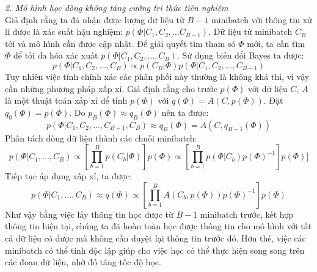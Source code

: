 \documentclass[fontsize=13pt]{scrartcl}
\begin{document}
\textit{2. Mô hình học dòng không tăng cường tri thức tiên nghiệm}\\
Giả định rằng ta đã nhận được lượng dữ liệu từ $B-1$ minibatch với thông tin xử lí được là xác suất hậu nghiệm: $p(\Phi | C_1,C_2,…C_{B-1} )$. Dữ liệu từ minibatch $C_B$ tới và mô hình cần được cập nhật.
Để giải quyết tìm tham só $\Phi$ mới, ta cần tìm $\Phi$ để tối đa hóa xác xuất $p(\Phi| C_1,C_2, …,C_B)$. Sử dụng biến đổi Bayes ta được:
\begin{equation}\label{eq:oldstream}
p(\Phi| C_1, C_2, \ldots,C_B) \propto p(C_B| \Phi)p(\Phi| C_1, C_2,\ldots, C_{B-1})
\end{equation}
Tuy nhiên việc tính chính xác các phân phối này thường là không khả thi, vì vậy cần những phương pháp xấp xỉ. 
Giả định rằng cho trước $p(\Phi)$ với dữ liệu $C$, $A$ là một thuật toán xấp xỉ để tính $p(\Phi)$ với $q(\Phi) = A(C,p(\Phi))$. Đặt $q_0(\Phi) = p(\Phi)$. Do $p_B(\Phi) \approx q_B(\Phi)$ nên ta được:
\begin{equation}
p(\Phi | C_1,C_2,\ldots,C_{B-1},C_B) \approx q_B(\Phi) = A(C,q_{B-1}(\Phi))
\end{equation}
Phân tách dòng dữ liệu thành các chuỗi minibatch:
\begin{equation}
p(\Phi | C_1,…,C_B ) \propto [ \prod_{b=1}^{B} p(C_b |  \Phi )]p(\Phi) \propto [\prod_{b=1}^{B} p(\Phi | C_b) p(\Phi)^{-1}]p(\Phi)]
\end{equation}
Tiếp tục áp dụng xấp xỉ, ta được:\\

\begin{equation}\label{eq:oldstreamupdate}
p(\Phi |C_1,...,C_B) \approx q(\Phi) \propto [\prod_{b=1}^{B} A(C_b,p(\Phi)) p(\Phi)^{-1}]p(\Phi)
\end{equation}
Như vậy bằng việc lấy thông tin học được từ $B-1$ minibatch trước, kết hợp thông tin hiện tại, chúng ta đã hoàn toàn học được thông tin cho mô hình với tất cả dữ liệu có được mà không cần  duyệt lại thông tin trước đó. Hơn thế, việc các minibatch có thể tính độc lập giúp cho việc học có thể thực hiện song song trên các đoạn dữ liệu, nhờ đó tăng tốc độ học.
\end{document}
